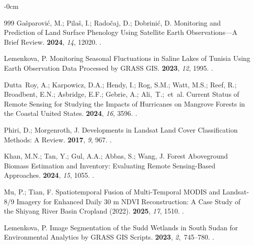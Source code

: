 \documentclass[jimaging,article,accept,pdftex,oneauthor]{Definitions/mdpi}
\begin{document}
\begin{adjustwidth}{-\extralength}{0cm}
\begin{thebibliography}{999}
Ga{\v s}parovi{\'c}, M.; Pila{\v s}, I.; Rado{\v c}aj, D.; Dobrini{\'c}, D.
\newblock Monitoring and Prediction of Land Surface Phenology Using Satellite
  Earth Observations---A Brief Review.
 {\bf 2024}, {\em 14}, {12020}.
.

Lemenkova, P.
\newblock Monitoring Seasonal Fluctuations in Saline Lakes of Tunisia Using
  Earth Observation Data Processed by GRASS GIS.
 {\bf 2023}, {\em 12}, {1995}.
.

Dutta~Roy, A.; Karpowicz, D.A.; Hendy, I.; Rog, S.M.; Watt, M.S.; Reef, R.;
  Broadbent, E.N.; Asbridge, E.F.; Gebrie, A.; \mbox{Ali, T.;  et~al.}
\newblock Current Status of Remote Sensing for Studying the Impacts of
  Hurricanes on Mangrove Forests in the Coastal United States.
 {\bf 2024}, {\em 16}, {3596}.
.

Phiri, D.; Morgenroth, J.
\newblock Developments in Landsat Land Cover Classification Methods: A Review.
 {\bf 2017}, {\em 9}, {967}.
.

Khan, M.N.; Tan, Y.; Gul, A.A.; Abbas, S.; Wang, J.
\newblock Forest Aboveground Biomass Estimation and Inventory: Evaluating
  Remote Sensing-Based Approaches.
 {\bf 2024}, {\em 15}, {1055}.
.

Mu, P.; Tian, F.
\newblock Spatiotemporal Fusion of Multi-Temporal MODIS and Landsat-8/9 Imagery
  for Enhanced Daily 30 m NDVI Reconstruction: A Case Study of the Shiyang
  River Basin Cropland (2022).
 {\bf 2025}, {\em 17}, {1510}.
.

Lemenkova, P.
\newblock Image Segmentation of the Sudd Wetlands in South Sudan for
  Environmental Analytics by GRASS GIS Scripts.
 {\bf 2023}, {\em 2},~745--780.
.


\end{thebibliography}
\end{adjustwidth}
\end{document}
